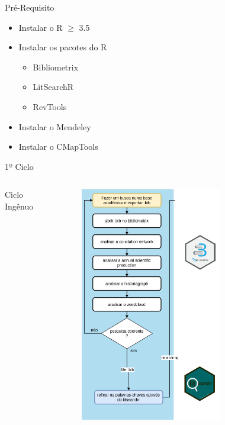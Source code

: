 \begin{frame}{Pré-Requisito}
	\begin{itemize}
		\item Instalar o R $\geq$ 3.5
		\item Instalar os pacotes do R
		\begin{itemize}
			\item Bibliometrix
			\item LitSearchR
			\item RevTools
		\end{itemize}
		\item Instalar o Mendeley
		\item Instalar o CMapTools
	\end{itemize}
\end{frame}

\begin{frame}{1º Ciclo}

	\begin{columns}
        Ciclo Ingênuo
		\begin{figure}[hb]
            \includegraphics[width=0.7\textwidth]{figures/ciclo1.png}
		\end{figure}
	\end{columns}
\end{frame}


